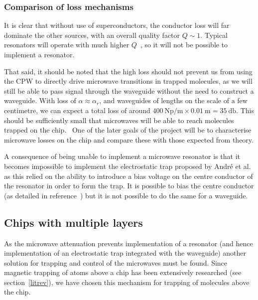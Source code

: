 \subsubsection*{Comparison of loss mechanisms}

It is clear that without use of superconductors, the conductor loss will far
dominate the other sources, with an overall quality factor $Q\sim1$. Typical
resonators will operate with much higher $Q$~\cite{}, so it will not be possible
to implement a resonator.

That said, it should be noted that the high loss should not prevent us from
using the CPW to directly drive microwave transitions in trapped molecules, as
we will still be able to pass signal through the waveguide without the need to
construct a waveguide. With loss of $\alpha \approx \alpha_r$, and waveguides of
lengths on the scale of a few centimetre, we can expect a total loss of around
$\SI{400}{\neper\per\metre} \times \SI{0.01}{\metre} = \SI{35}{\decibel}$. This
should be sufficiently small that microwaves will be able to reach molecules
trapped on the chip.~\cite{Treutlein2008}
%
One of the later goals of the project will be to characterise microwave losses
on the chip and compare these with those expected from theory.

A consequence of being unable to implement a microwave resonator is that it
becomes impossible to implement the electrostatic trap proposed by Andr\'e et
al.~\cite{Andre2006} as this relied on the ability to introduce a bias voltage
on the centre conductor of the resonator in order to form the trap.   It is possible to bias the
centre conductor (as detailed in reference~\cite{doi:10.1063/1.3573824}) but it
is not possible to do the same for a waveguide.

\subsection{Chips with multiple layers}



As the microwave attenuation prevents implementation of a resonator (and hence
implementation of an electrostatic trap integrated with the waveguide) another
solution for trapping and control of the microwaves must be found. Since
magnetic trapping of atoms above a chip has been extensively researched (see
section~\ref{litrev}), we have chosen this mechanism for trapping of molecules
above the chip. 

